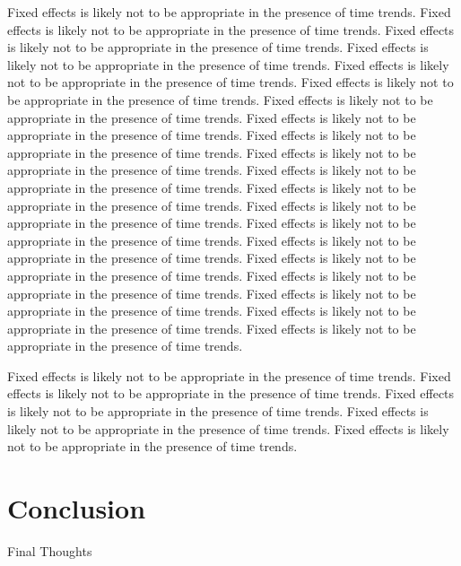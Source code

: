 \documentclass[11pt]{article}
\begin{document}
Fixed effects is likely not to be appropriate in the presence of time trends. 
Fixed effects is likely not to be appropriate in the presence of time trends. 
Fixed effects is likely not to be appropriate in the presence of time trends. 
Fixed effects is likely not to be appropriate in the presence of time trends. 
Fixed effects is likely not to be appropriate in the presence of time trends. 
Fixed effects is likely not to be appropriate in the presence of time trends. 
Fixed effects is likely not to be appropriate in the presence of time trends. 
Fixed effects is likely not to be appropriate in the presence of time trends. 
Fixed effects is likely not to be appropriate in the presence of time trends. 
Fixed effects is likely not to be appropriate in the presence of time trends. 
Fixed effects is likely not to be appropriate in the presence of time trends. 
Fixed effects is likely not to be appropriate in the presence of time trends. 
Fixed effects is likely not to be appropriate in the presence of time trends. 
Fixed effects is likely not to be appropriate in the presence of time trends. 
Fixed effects is likely not to be appropriate in the presence of time trends. 
Fixed effects is likely not to be appropriate in the presence of time trends. 
Fixed effects is likely not to be appropriate in the presence of time trends. 
Fixed effects is likely not to be appropriate in the presence of time trends. 
Fixed effects is likely not to be appropriate in the presence of time trends. 
Fixed effects is likely not to be appropriate in the presence of time trends. 

Fixed effects is likely not to be appropriate in the presence of time trends. 
Fixed effects is likely not to be appropriate in the presence of time trends. 
Fixed effects is likely not to be appropriate in the presence of time trends. 
Fixed effects is likely not to be appropriate in the presence of time trends. 
Fixed effects is likely not to be appropriate in the presence of time trends. 



\section{Conclusion}

Final Thoughts

\makeatletter
\renewcommand\@biblabel[1]{}
\makeatother
\end{document}
